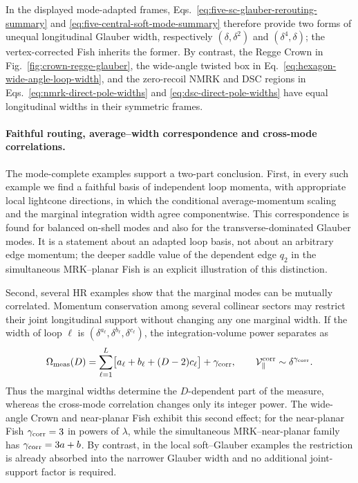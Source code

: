 \documentclass[a4paper,11pt]{article}
\begin{document}
In the displayed mode-adapted frames,
Eqs.~\eqref{eq:five-sc-glauber-rerouting-summary} and
\eqref{eq:five-central-soft-mode-summary} therefore provide two forms of
unequal longitudinal Glauber width, respectively
\((\delta,\delta^2)\) and \((\delta^4,\delta)\); the vertex-corrected Fish
inherits the former.  By contrast, the Regge Crown in
Fig.~\ref{fig:crown-regge-glauber}, the wide-angle twisted box in
Eq.~\eqref{eq:hexagon-wide-angle-loop-width}, and the zero-recoil NMRK and DSC
regions in Eqs.~\eqref{eq:nmrk-direct-pole-widths} and
\eqref{eq:dsc-direct-pole-widths} have equal longitudinal widths in their
symmetric frames.

\paragraph{Faithful routing, average--width correspondence and cross-mode
correlations.}
\label{par:faithful-routing-average-width}
The mode-complete examples support a two-part conclusion.  First, in every
such example we find a faithful basis of independent loop momenta, with
appropriate local lightcone directions, in which the conditional
average-momentum scaling and the marginal integration width agree
componentwise.  This correspondence is found for balanced on-shell modes and also for
the transverse-dominated Glauber modes.  It is a statement about an adapted
loop basis, not about an arbitrary edge momentum; the deeper saddle value of
the dependent edge \(q_2\) in the simultaneous MRK--planar Fish is an
explicit illustration of this distinction.

Second, several HR examples show that the marginal modes can be mutually
correlated.  Momentum
conservation among several collinear sectors may restrict their joint
longitudinal support without changing any one marginal width.  If the width
of loop \(\ell\) is
\((\delta^{a_\ell},\delta^{b_\ell},\delta^{c_\ell})\), the integration-volume
power separates as
\begin{equation}
 \Omega_{\rm meas}(D)=
 \sum_{\ell=1}^{L}\bigl[a_\ell+b_\ell+(D-2)c_\ell\bigr]
 +\gamma_{\rm corr},
 \qquad
 \mathcal V_{\parallel}^{\rm corr}\sim\delta^{\gamma_{\rm corr}}.
 \label{eq:width-correlation-measure-split}
\end{equation}
Thus the marginal widths determine the \(D\)-dependent part of the measure,
whereas the cross-mode correlation changes only its integer power.  The
wide-angle Crown and near-planar Fish exhibit this second effect; for the
near-planar Fish \(\gamma_{\rm corr}=3\) in powers of \(\lambda\), while the
simultaneous MRK--near-planar family has
\(\gamma_{\rm corr}=3a+b\).  By contrast, in the local soft--Glauber examples
the restriction is already absorbed into the narrower Glauber width and no
additional joint-support factor is required.
\end{document}
